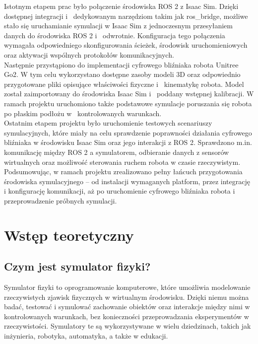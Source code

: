 \documentclass[12pt]{article}
\begin{document}
\noindent Istotnym etapem prac było połączenie środowiska ROS 2 z Isaac Sim. Dzięki dostępnej integracji i~ dedykowanym narzędziom takim jak ros\_bridge, możliwe stało się uruchamianie symulacji w Isaac Sim z jednoczesnym przesyłaniem danych do środowiska ROS 2 i~ odwrotnie. Konfiguracja tego połączenia wymagała odpowiedniego skonfigurowania ścieżek, środowisk uruchomieniowych oraz aktywacji wspólnych protokołów komunikacyjnych.\\

\noindent Następnie przystąpiono do implementacji cyfrowego bliźniaka robota Unitree Go2. W tym celu wykorzystano dostępne zasoby modeli 3D oraz odpowiednio przygotowane pliki opisujące właściwości fizyczne i~ kinematykę robota. Model został zaimportowany do środowiska Isaac Sim i~ poddany wstępnej kalibracji. W ramach projektu uruchomiono także podstawowe symulacje poruszania się robota po płaskim podłożu w~ kontrolowanych warunkach.\\

\noindent Ostatnim etapem projektu było uruchomienie testowych scenariuszy symulacyjnych, które miały na celu sprawdzenie poprawności działania cyfrowego bliźniaka w środowisku Isaac Sim oraz jego interakcji z ROS 2. Sprawdzono m.in. komunikację między ROS 2 a symulatorem, odbieranie danych z sensorów wirtualnych oraz możliwość sterowania ruchem robota w czasie rzeczywistym.\\

\noindent Podsumowując, w ramach projektu zrealizowano pełny łańcuch przygotowania środowiska symulacyjnego – od instalacji wymaganych platform, przez integrację i konfigurację komunikacji, aż po uruchomienie cyfrowego bliźniaka robota i przeprowadzenie próbnych symulacji.

\section{Wstęp teoretyczny}

\subsection{Czym jest symulator fizyki?}
Symulator fizyki to oprogramowanie komputerowe, które umożliwia modelowanie rzeczywistych zjawisk fizycznych w wirtualnym środowisku. Dzięki niemu można badać, testować i symulować zachowanie obiektów oraz interakcje między nimi w kontrolowanych warunkach, bez konieczności przeprowadzania eksperymentów w rzeczywistości. Symulatory te są wykorzystywane w wielu dziedzinach, takich jak inżynieria, robotyka, automatyka, a także w edukacji.
\end{document}
